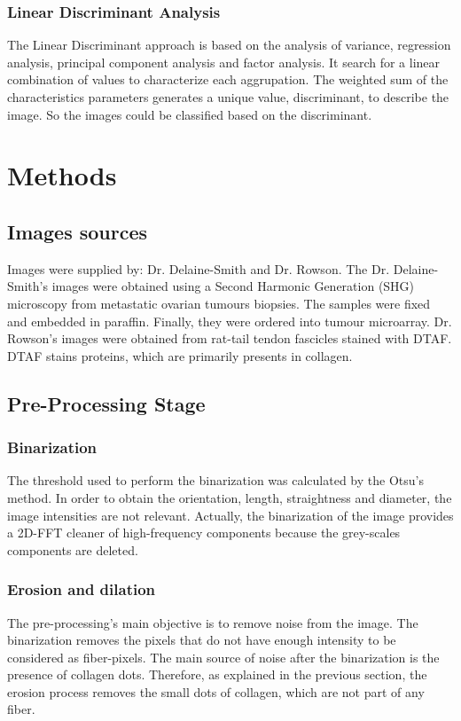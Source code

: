 \documentclass[12pt,a4paper]{article}
\begin{document}
\subsubsection{Linear Discriminant Analysis}

The Linear Discriminant approach is based on the analysis of variance, regression analysis, principal component analysis and factor analysis. It search for a linear combination of values to characterize each aggrupation. The weighted sum of the characteristics parameters generates a unique value, discriminant, to describe the image. So the images could be classified based on the discriminant.

\section{Methods}
\subsection{Images sources}
Images were supplied by: Dr. Delaine-Smith and Dr. Rowson. The  Dr. Delaine-Smith's images were obtained using a Second Harmonic Generation (SHG) microscopy from metastatic ovarian tumours biopsies. The samples were fixed and  embedded in paraffin. Finally, they were ordered into tumour microarray.  Dr. Rowson's images were obtained from rat-tail tendon fascicles stained with DTAF. DTAF stains proteins, which are primarily presents in collagen.

\subsection{Pre-Processing Stage}
\subsubsection{Binarization}
The threshold used to perform the binarization was calculated by the Otsu’s method. In order to obtain the orientation, length, straightness and diameter, the image intensities are not relevant. Actually, the binarization of the image provides a 2D-FFT cleaner of high-frequency components because the grey-scales components are deleted.
\subsubsection{Erosion and dilation}
The pre-processing's main objective is to remove noise from the image. The binarization removes the pixels that do not have enough intensity to be considered as fiber-pixels. The main source of noise after the binarization is the presence of collagen dots. Therefore, as explained in the previous section, the erosion process removes the small dots of collagen, which are not part of any fiber.
\end{document}
